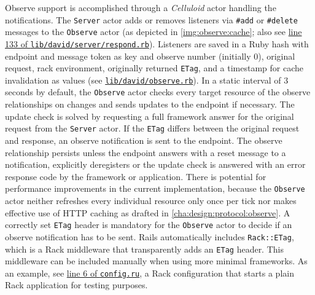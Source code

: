 		Observe support is accomplished through a \emph{Celluloid} actor
		handling the notifications. The \texttt{Server} actor adds or removes
		listeners via \texttt{\#add} or \texttt{\#delete} messages to the
		\texttt{Observe} actor (as depicted in \autoref{img:observe:cache};
		also see
		\href{https://github.com/nning/david/blob/0.4.3/lib/david/server/respond.rb#L133}{line
		133 of \texttt{lib/david/server/respond.rb}}). Listeners are saved in a
		Ruby hash with endpoint and message token as key and observe number
		(initially 0), original request, rack environment, originally returned
		\texttt{ETag}, and a timestamp for cache invalidation as values (see
		\href{https://github.com/nning/david/blob/0.4.3/lib/david/observe.rb}{\texttt{lib/david/observe.rb}}).
		In a static interval of 3 seconds by default, the \texttt{Observe}
		actor checks every target resource of the observe relationships on
		changes and sends updates to the endpoint if necessary. The update
		check is solved by requesting a full framework answer for the original
		request from the \texttt{Server} actor. If the \texttt{ETag} differs
		between the original request and response, an observe notification is
		sent to the endpoint. The observe relationship persists unless the
		endpoint answers with a reset message to a notification, explicitly
		deregisters or the update check is answered with an error response code
		by the framework or application. There is potential for performance
		improvements in the current implementation, because the
		\texttt{Observe} actor neither refreshes every individual resource only
		once per tick nor makes effective use of \ac{HTTP} caching as drafted
		in \autoref{cha:design:protocol:observe}. A correctly set \texttt{ETag}
		header is mandatory for the \texttt{Observe} actor to decide if an
		observe notification has to be sent. Rails automatically includes
		\texttt{Rack::ETag}, which is a Rack middleware that transparently adds
		an \texttt{ETag} header. This middleware can be included manually when
		using more minimal frameworks. As an example, see
		\href{https://github.com/nning/david/blob/0.4.3/config.ru#L6}{line
		6 of \texttt{config.ru}}, a Rack configuration that starts a plain Rack
		application for testing purposes.

